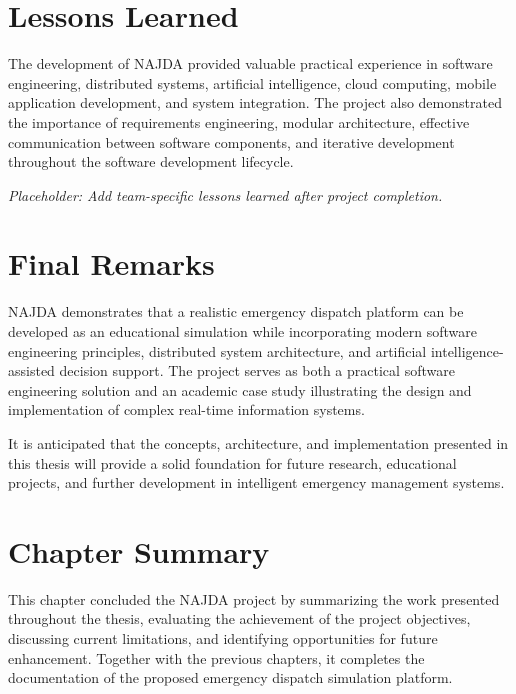 
\section{Lessons Learned}

The development of NAJDA provided valuable practical experience in software engineering, distributed systems, artificial intelligence, cloud computing, mobile application development, and system integration. The project also demonstrated the importance of requirements engineering, modular architecture, effective communication between software components, and iterative development throughout the software development lifecycle.

\textit{Placeholder: Add team-specific lessons learned after project completion.}


\section{Final Remarks}

NAJDA demonstrates that a realistic emergency dispatch platform can be developed as an educational simulation while incorporating modern software engineering principles, distributed system architecture, and artificial intelligence-assisted decision support. The project serves as both a practical software engineering solution and an academic case study illustrating the design and implementation of complex real-time information systems.

It is anticipated that the concepts, architecture, and implementation presented in this thesis will provide a solid foundation for future research, educational projects, and further development in intelligent emergency management systems.


\section{Chapter Summary}

This chapter concluded the NAJDA project by summarizing the work presented throughout the thesis, evaluating the achievement of the project objectives, discussing current limitations, and identifying opportunities for future enhancement. Together with the previous chapters, it completes the documentation of the proposed emergency dispatch simulation platform.
